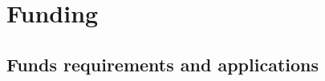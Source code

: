 
\part{Funding}
\newpage
\chapter{Funds requirements and applications} \label{ch:hendrerit}

%


%
%


